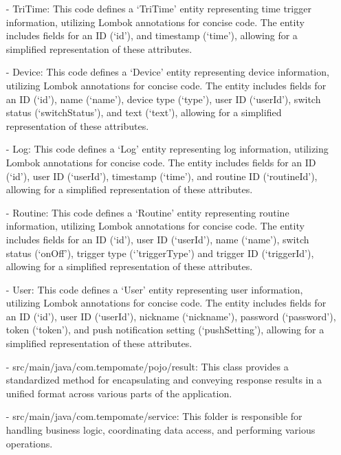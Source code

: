 \begin{enumerate}
    \item[-] TriTime: This code defines a ‘TriTime' entity representing time trigger information, utilizing Lombok annotations for concise code. The entity includes fields for an ID (‘id’), and timestamp (‘time’), allowing for a simplified representation of these attributes.\\
    \item[-] Device: This code defines a ‘Device' entity representing device information, utilizing Lombok annotations for concise code. The entity includes fields for an ID (‘id’), name (‘name’), device type (‘type’), user ID (‘userId’), switch status (‘switchStatus’), and text (‘text’), allowing for a simplified representation of these attributes.\\
    \item[-] Log: This code defines a ‘Log' entity representing log information, utilizing Lombok annotations for concise code. The entity includes fields for an ID (‘id’), user ID (‘userId’), timestamp (‘time’), and routine ID (‘routineId’), allowing for a simplified representation of these attributes. \\
    \item[-] Routine: This code defines a ‘Routine' entity representing routine information, utilizing Lombok annotations for concise code. The entity includes fields for an ID (‘id’), user ID (‘userId’), name (‘name’), switch status (‘onOff’), trigger type (‘’triggerType’) and trigger ID (‘triggerId’), allowing for a simplified representation of these attributes.\\
    \item[-] User: This code defines a ‘User' entity representing user information, utilizing Lombok annotations for concise code. The entity includes fields for an ID (‘id’), user ID (‘userId’), nickname (‘nickname’), password (‘password’), token (‘token’), and push notification setting (‘pushSetting’), allowing for a simplified representation of these attributes.\\
    \item[-] src/main/java/com.tempomate/pojo/result: This class provides a standardized method for encapsulating and conveying response results in a unified format across various parts of the application.\\
    \item[-] src/main/java/com.tempomate/service: This folder is responsible for handling business logic, coordinating data access, and performing various operations.\\

\end{enumerate}
